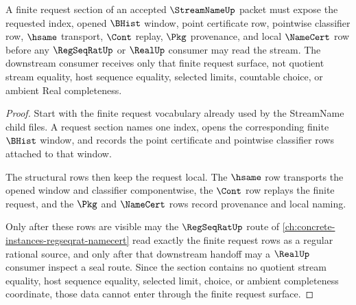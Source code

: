 \begin{theorem}
\label{thm:streamname-finite-request-obligation-surface}
A finite request section of an accepted $\StreamNameUp$ packet must expose the requested index, opened $\BHist$ window, point certificate row, pointwise classifier row, $\hsame$ transport, $\Cont$ replay, $\Pkg$ provenance, and local $\NameCert$ row before any $\RegSeqRatUp$ or $\RealUp$ consumer may read the stream. The downstream consumer receives only that finite request surface, not quotient stream equality, host sequence equality, selected limits, countable choice, or ambient Real completeness.
\end{theorem}
\begin{proof}
Start with the finite request vocabulary already used by the StreamName child files. A request section names one index, opens the corresponding finite $\BHist$ window, and records the point certificate and pointwise classifier rows attached to that window.

The structural rows then keep the request local. The $\hsame$ row transports the opened window and classifier componentwise, the $\Cont$ row replays the finite request, and the $\Pkg$ and $\NameCert$ rows record provenance and local naming.

Only after these rows are visible may the $\RegSeqRatUp$ route of \autoref{ch:concrete-instances-regseqrat-namecert} read exactly the finite request rows as a regular rational source, and only after that downstream handoff may a $\RealUp$ consumer inspect a seal route. Since the section contains no quotient stream equality, host sequence equality, selected limit, choice, or ambient completeness coordinate, those data cannot enter through the finite request surface.
\end{proof}
